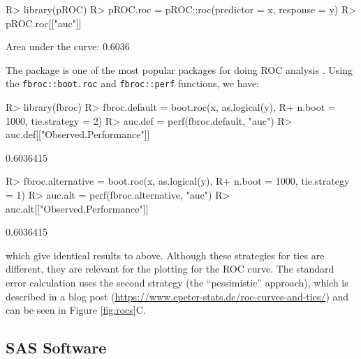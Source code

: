 \documentclass[article]{jss}
\begin{document}
\begin{CodeChunk}

\begin{CodeInput}
R> library(pROC)
R> pROC.roc = pROC::roc(predictor = x, response = y)
R> pROC.roc[["auc"]]
\end{CodeInput}

\begin{CodeOutput}
Area under the curve: 0.6036
\end{CodeOutput}
\end{CodeChunk}

The  package is one of the most popular packages for doing
ROC analysis \citep{fbroc}. Using the \texttt{fbroc::boot.roc} and
\texttt{fbroc::perf} functions, we have:

\begin{CodeChunk}

\begin{CodeInput}
R> library(fbroc)
R> fbroc.default = boot.roc(x, as.logical(y), 
R+                          n.boot = 1000, tie.strategy = 2)
R> auc.def = perf(fbroc.default, "auc")
R> auc.def[["Observed.Performance"]]
\end{CodeInput}

\begin{CodeOutput}
[1] 0.6036415
\end{CodeOutput}

\begin{CodeInput}
R> fbroc.alternative = boot.roc(x, as.logical(y), 
R+                              n.boot = 1000, tie.strategy = 1)
R> auc.alt = perf(fbroc.alternative, "auc")
R> auc.alt[["Observed.Performance"]]
\end{CodeInput}

\begin{CodeOutput}
[1] 0.6036415
\end{CodeOutput}
\end{CodeChunk}

which give identical results to above. Although these strategies for
ties are different, they are relevant for the plotting for the ROC
curve. The standard error calculation uses the second strategy (the
``pessimistic'' approach), which is described in a blog post
(\url{https://www.epeter-stats.de/roc-curves-and-ties/}) and can be seen
in Figure \ref{fig:rocs}C.

\hypertarget{sas-software}{%
\subsection{SAS Software}\label{sas-software}}
\end{document}

